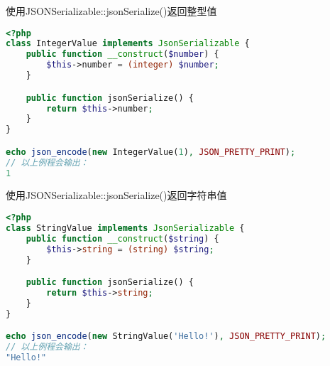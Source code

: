 \begin{example}
使用JSONSerializable::jsonSerialize()返回整型值
\begin{lstlisting}[language=PHP]
<?php
class IntegerValue implements JsonSerializable {
    public function __construct($number) {
        $this->number = (integer) $number;
    }

    public function jsonSerialize() {
        return $this->number;
    }
}

echo json_encode(new IntegerValue(1), JSON_PRETTY_PRINT);
// 以上例程会输出：
1
\end{lstlisting}
\end{example}




\begin{example}
使用JSONSerializable::jsonSerialize()返回字符串值
\begin{lstlisting}[language=PHP]
<?php
class StringValue implements JsonSerializable {
    public function __construct($string) {
        $this->string = (string) $string;
    }

    public function jsonSerialize() {
        return $this->string;
    }
}

echo json_encode(new StringValue('Hello!'), JSON_PRETTY_PRINT);
// 以上例程会输出：
"Hello!"
\end{lstlisting}
\end{example}
